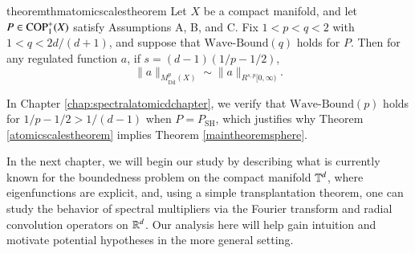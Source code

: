 \vspace{0.4em}

\begin{restatable}{theorem}{thmatomicscalestheorem} \label{atomicscalestheorem}
  Let $X$ be a compact manifold, and let $P \in {\text{COP}^{+}_{{1}}}(X)$ satisfy Assumptions A, B, and C. Fix $1 < p < q < 2$ with $1 < q < 2d/(d+1)$, and suppose that $\text{Wave-Bound}(q)$ holds for $P$. Then for any regulated function $a$, if $s = (d-1)(1/p - 1/2)$,
  \[ \| a \|_{M^p_{\text{Dil}}(X)} \sim \| a \|_{R^{s,p}[0,\infty)}. \]
\end{restatable}

In Chapter \ref{chap:spectralatomicdchapter}, we verify that $\text{Wave-Bound}(p)$ holds for $1/p - 1/2 > 1/(d-1)$ when $P = P_{\text{SH}}$, which justifies why Theorem \ref{atomicscalestheorem} implies Theorem \ref{maintheoremsphere}.%



In the next chapter, we will begin our study by describing what is currently known for the boundedness problem on the compact manifold $\operatorname{\mathbb{T}}^d$, where eigenfunctions are explicit, and, using a simple transplantation theorem, one can study the behavior of spectral multipliers via the Fourier transform and radial convolution operators on $\operatorname{\mathbb{R}}^d$. Our analysis here will help gain intuition and motivate potential hypotheses in the more general setting.

